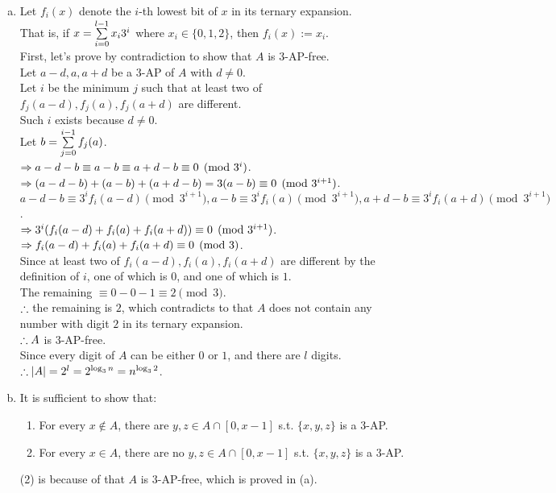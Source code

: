 \setcounter{pr}{5}
\begin{pr}$ $
\begin{enumerate}[(a)]
\item Let $f_i(x)$ denote the $i$-th lowest bit of $x$ in its ternary expansion.\\
That is, if $x=\sum\limits_{i=0}^{l-1}x_i3^i$ where $x_i\in\{0, 1, 2\}$, then $f_i(x):=x_i$.\\
First, let's prove by contradiction to show that $A$ is $3$-AP-free.\\
Let $a-d, a, a+d$ be a $3$-AP of $A$ with $d\neq0$.\\
Let $i$ be the minimum $j$ such that at least two of $f_j(a-d), f_j(a), f_j(a+d)$ are different.\\
Such $i$ exists because $d\neq0$.\\
Let $b=\sum\limits_{j=0}^{i-1}f_j(a)$.\\
$\Rightarrow a-d-b\equiv a-b\equiv a+d-b\equiv0\pmod{3^i}$.\\
$\Rightarrow(a-d-b)+(a-b)+(a+d-b)=3(a-b)\equiv0\pmod{3^{i+1}}$.\\
$a-d-b\equiv3^if_i(a-d)\pmod{3^{i+1}}, a-b\equiv3^if_i(a)\pmod{3^{i+1}}, a+d-b\equiv3^if_i(a+d)\pmod{3^{i+1}}$.\\
$\Rightarrow3^i(f_i(a-d)+f_i(a)+f_i(a+d))\equiv0\pmod{3^{i+1}}$.\\
$\Rightarrow f_i(a-d)+f_i(a)+f_i(a+d)\equiv0\pmod3$.\\
Since at least two of $f_i(a-d), f_i(a), f_i(a+d)$ are different by the definition of $i$, one of which is $0$, and one of which is $1$.\\
The remaining $\equiv0-0-1\equiv2\pmod3$.\\
$\therefore$ the remaining is $2$, which contradicts to that $A$ does not contain any number with digit $2$ in its ternary expansion.\\
$\therefore A$ is $3$-AP-free.\\
Since every digit of $A$ can be either $0$ or $1$, and there are $l$ digits.\\
$\therefore|A|=2^l=2^{\log_3n}=n^{\log_32}$.
\item It is sufficient to show that:
\begin{enumerate}[(1)]
\item For every $x\notin A$, there are $y, z\in A\cap[0, x-1]$ s.t. $\{x, y, z\}$ is a $3$-AP.
\item For every $x\in A$, there are no $y, z\in A\cap[0, x-1]$ s.t. $\{x, y, z\}$ is a $3$-AP.
\end{enumerate}
(2) is because of that $A$ is $3$-AP-free, which is proved in (a).\\

\end{enumerate}
\end{pr}
